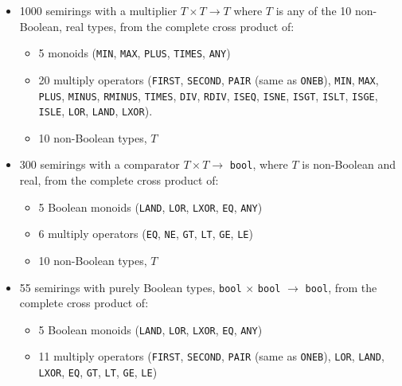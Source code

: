 \documentclass[12pt]{article}
\begin{document}
\vspace{-0.05in}
\begin{itemize}
\item 1000 semirings with a multiplier $T \times T \rightarrow T$ where $T$ is
    any of the 10 non-Boolean, real types, from the complete cross product of:

    \vspace{-0.05in}
    \begin{itemize}
    \item 5 monoids (\verb'MIN', \verb'MAX', \verb'PLUS', \verb'TIMES', \verb'ANY')
    \item 20 multiply operators
    (\verb'FIRST', \verb'SECOND', \verb'PAIR' (same as \verb'ONEB'),
    \verb'MIN', \verb'MAX',
    \verb'PLUS', \verb'MINUS', \verb'RMINUS', \verb'TIMES', \verb'DIV', \verb'RDIV',
    \verb'ISEQ', \verb'ISNE', \verb'ISGT',
    \verb'ISLT', \verb'ISGE', \verb'ISLE',
    \verb'LOR', \verb'LAND', \verb'LXOR').
    \item 10 non-Boolean types, $T$
    \end{itemize}

\item 300 semirings with a comparator $T \times T \rightarrow$
    \verb'bool', where $T$ is non-Boolean and real, from the complete cross product of:

    \vspace{-0.05in}
    \begin{itemize}
    \item 5 Boolean monoids
    (\verb'LAND', \verb'LOR', \verb'LXOR', \verb'EQ', \verb'ANY')
    \item 6 multiply operators
    (\verb'EQ', \verb'NE', \verb'GT', \verb'LT', \verb'GE', \verb'LE')
    \item 10 non-Boolean types, $T$
    \end{itemize}

\item 55 semirings with purely Boolean types, \verb'bool' $\times$ \verb'bool'
    $\rightarrow$ \verb'bool', from the complete cross product of:

    \vspace{-0.05in}
    \begin{itemize}
    \item 5 Boolean monoids
    (\verb'LAND', \verb'LOR', \verb'LXOR', \verb'EQ', \verb'ANY')
    \item 11 multiply operators
    (\verb'FIRST', \verb'SECOND', \verb'PAIR' (same as \verb'ONEB'),
    \verb'LOR', \verb'LAND', \verb'LXOR',
    \verb'EQ', \verb'GT', \verb'LT', \verb'GE', \verb'LE')
    \end{itemize}


\end{itemize}
\end{document}
